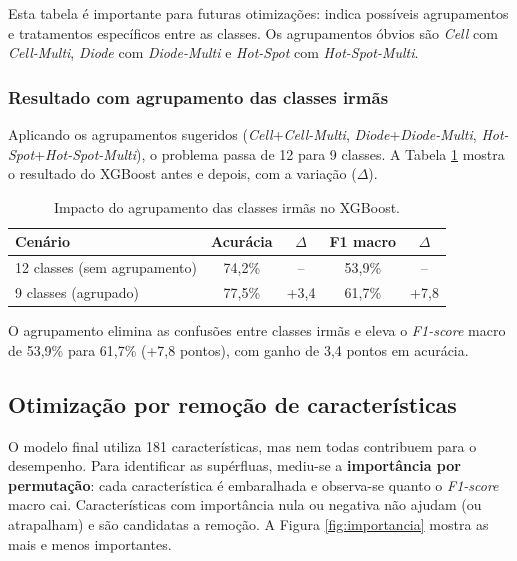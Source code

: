 \documentclass[a4paper,11pt]{article}
\begin{document}
Esta tabela é importante para futuras otimizações: indica possíveis agrupamentos e tratamentos específicos entre as classes. Os agrupamentos óbvios são \textit{Cell} com \textit{Cell-Multi}, \textit{Diode} com \textit{Diode-Multi} e \textit{Hot-Spot} com \textit{Hot-Spot-Multi}.

\subsubsection{Resultado com agrupamento das classes irmãs}

Aplicando os agrupamentos sugeridos (\textit{Cell}+\textit{Cell-Multi}, \textit{Diode}+\textit{Diode-Multi}, \textit{Hot-Spot}+\textit{Hot-Spot-Multi}), o problema passa de 12 para 9 classes. A Tabela \ref{tab:agrupamento} mostra o resultado do XGBoost antes e depois, com a variação ($\Delta$).

\begin{table}[H]
	\centering
	\caption{Impacto do agrupamento das classes irmãs no XGBoost.}
	\label{tab:agrupamento}
	\vspace{0.2cm}
	\renewcommand{\arraystretch}{1.2}
	\begin{tabular}{l c c c c}
		\hline
		\textbf{Cenário} & \textbf{Acurácia} & \textbf{$\Delta$} & \textbf{F1 macro} & \textbf{$\Delta$} \\
		\hline
		12 classes (sem agrupamento) & 74,2\% & --     & 53,9\% & --     \\ \hline
		9 classes (agrupado)         & 77,5\% & +3,4   & 61,7\% & +7,8   \\
		\hline
	\end{tabular}
\end{table}

O agrupamento elimina as confusões entre classes irmãs e eleva o \textit{F1-score} macro de 53,9\% para 61,7\% (+7,8 pontos), com ganho de 3,4 pontos em acurácia.

\subsection{Otimização por remoção de características}

O modelo final utiliza 181 características, mas nem todas contribuem para o desempenho. Para identificar as supérfluas, mediu-se a \textbf{importância por permutação}: cada característica é embaralhada e observa-se quanto o \textit{F1-score} macro cai. Características com importância nula ou negativa não ajudam (ou atrapalham) e são candidatas a remoção. A Figura \ref{fig:importancia} mostra as mais e menos importantes.
\end{document}
